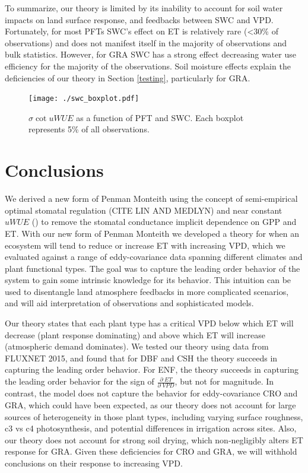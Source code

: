 \documentclass[draft,linenumbers]{agujournal}
\begin{document}
To summarize, our theory is limited by its inability to account for soil water impacts on land surface response, and feedbacks between SWC and VPD. Fortunately, for most PFTs SWC's effect on ET is relatively rare (<30\% of observations) and does not manifest itself in the majority of observations and bulk statistics. However, for GRA SWC has a strong effect decreasing water use efficiency for the majority of the observations. Soil moisture effects explain the deficiencies of our theory in Section \ref{testing}, particularly for GRA.

\begin{figure}[h]
\centering
\texttt{[image: ./swc\_boxplot.pdf]}
\caption{$\sigma \cot uWUE$ as a function of PFT and SWC. Each boxplot represents 5\% of all observations.}
\label{swc}
\end{figure}

\section{Conclusions} 

We derived a new form of Penman Monteith using the concept of semi-empirical optimal stomatal regulation (CITE LIN AND MEDLYN) and near constant $uWUE$ (\cite{Zhou_2015}) to remove the stomatal conductance implicit dependence on GPP and ET. With our new form of Penman Monteith we developed a theory for when an ecosystem will tend to reduce or increase ET with increasing VPD, which we evaluated against a range of eddy-covariance data spanning different climates and plant functional types. The goal was to capture the leading order behavior of the system to gain some intrinsic knowledge for its behavior. This intuition can be used to disentangle land atmosphere feedbacks in more complicated scenarios, and will aid interpretation of observations and sophisticated models.

Our theory states that each plant type has a critical VPD below which ET will decrease (plant response dominating) and above which ET will increase (atmospheric demand dominates). We tested our theory using data from FLUXNET 2015, and found that for DBF and CSH the theory succeeds in capturing the leading order behavior. For ENF, the theory succeeds in capturing the leading order behavior for the sign of $\frac{\partial \; ET}{\partial \; VPD}$, but not for magnitude. In contrast, the model does not capture the behavior for eddy-covariance CRO and GRA, which could have been expected, as our theory does not account for large sources of heterogeneity in those plant types, including varying surface roughness, c3 vs c4 photosynthesis, and potential differences in irrigation across sites. Also, our theory does not account for strong soil drying, which non-negligibly alters ET response for GRA. Given these deficiencies for CRO and GRA, we will withhold conclusions on their response to increasing VPD.
\end{document}
